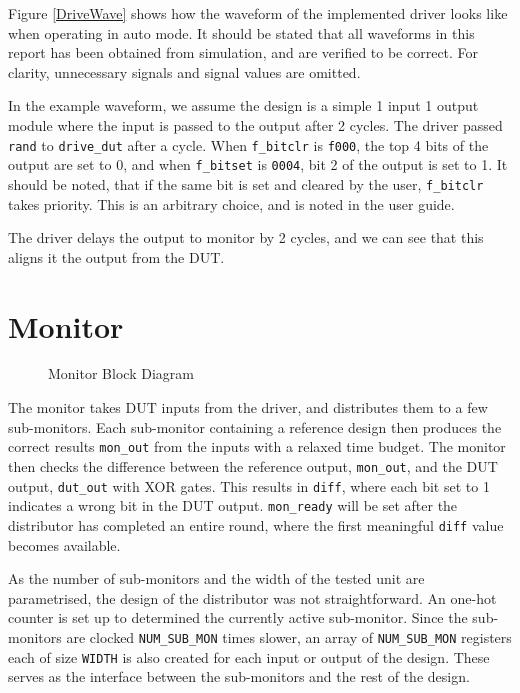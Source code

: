 Figure \ref{DriveWave} shows how the waveform of the implemented driver looks like when operating in auto mode.
It should be stated that all waveforms in this report has been obtained from simulation, and are verified to be correct.
For clarity, unnecessary signals and signal values are omitted.

In the example waveform, we assume the design is a simple 1 input 1 output module where the input is passed to the output after 2 cycles.
The driver passed \texttt{rand} to \texttt{drive\_dut} after a cycle.
When \texttt{f\_bitclr} is \texttt{f000}, the top 4 bits of the output are set to 0, and when \texttt{f\_bitset} is \texttt{0004}, bit 2 of the output is set to 1.
It should be noted, that if the same bit is set and cleared by the user, \texttt{f\_bitclr} takes priority.
This is an arbitrary choice, and is noted in the user guide.

The driver delays the output to monitor by 2 cycles, and we can see that this aligns it the output from the DUT.

\section{Monitor}
\begin{figure}[H]
  \centering
  
  \caption{Monitor Block Diagram}
  \label{MonitorBlk}
\end{figure}

The monitor takes DUT inputs from the driver, and distributes them to a few sub-monitors.
Each sub-monitor containing a reference design then produces the correct results \texttt{mon\_out} from the inputs with a relaxed time budget.
The monitor then checks the difference between the reference output, \texttt{mon\_out}, and the DUT output, \texttt{dut\_out} with XOR gates.
This results in \texttt{diff}, where each bit set to 1 indicates a wrong bit in the DUT output.
\texttt{mon\_ready} will be set after the distributor has completed an entire round, where the first meaningful \texttt{diff} value becomes available.

As the number of sub-monitors and the width of the tested unit are parametrised, the design of the distributor was not straightforward.
An one-hot counter is set up to determined the currently active sub-monitor.
Since the sub-monitors are clocked \texttt{NUM\_SUB\_MON} times slower, an array of \texttt{NUM\_SUB\_MON} registers each of size \texttt{WIDTH} is also created for each input or output of the design.
These serves as the interface between the sub-monitors and the rest of the design.

